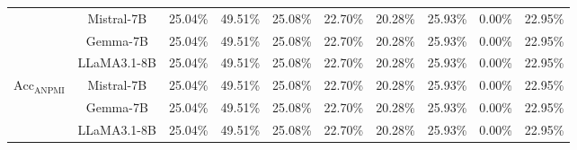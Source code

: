 \begin{table*}[!t]
{\begin{tabular}{c|c|c|c|c|c|c|c|c|c}
                & Mistral-7B & 25.04\% & 49.51\% & 25.08\% & 22.70\% & 20.28\% & 25.93\% & 0.00\% & 22.95\% \\ \cline{2-10}
                & Gemma-7B & 25.04\% & 49.51\% & 25.08\% & 22.70\% & 20.28\% & 25.93\% & 0.00\% & 22.95\% \\ \cline{2-10}
                & LLaMA3.1-8B & 25.04\% & 49.51\% & 25.08\% & 22.70\% & 20.28\% & 25.93\% & 0.00\% & 22.95\% \\ \hline
\multirow{3}{*}{$\text{Acc}_\text{ANPMI}$} 
                & Mistral-7B & 25.04\% & 49.51\% & 25.08\% & 22.70\% & 20.28\% & 25.93\% & 0.00\% & 22.95\% \\ \cline{2-10}
                & Gemma-7B & 25.04\% & 49.51\% & 25.08\% & 22.70\% & 20.28\% & 25.93\% & 0.00\% & 22.95\% \\ \cline{2-10}
                & LLaMA3.1-8B & 25.04\% & 49.51\% & 25.08\% & 22.70\% & 20.28\% & 25.93\% & 0.00\% & 22.95\% \\ \hline
\end{tabular}
}
\end{table*}

